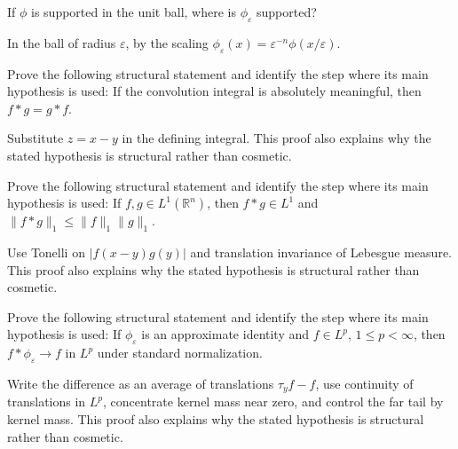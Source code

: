 \begin{problem}\label{prob:iii10-problem-08}
If \(\phi\) is supported in the unit ball, where is \(\phi_\varepsilon\) supported?
\end{problem}
\begin{solution}
In the ball of radius \(\varepsilon\), by the scaling
\(\phi_\varepsilon(x)=\varepsilon^{-n}\phi(x/\varepsilon)\).
\end{solution}

\begin{problem}[Commutativity]\label{prob:iii10-problem-09}
Prove the following structural statement and identify the step where its main hypothesis is used: If the convolution integral is absolutely meaningful, then $f*g=g*f$.
\end{problem}
\begin{solution}
Substitute $z=x-y$ in the defining integral. This proof also explains why the stated hypothesis is structural rather than cosmetic.
\end{solution}

\begin{problem}\label{prob:iii10-problem-10}
Prove the following structural statement and identify the step where its main hypothesis is used: If $f,g\in L^1(\mathbb R^n)$, then $f*g\in L^1$ and $\|f*g\|_1\le\|f\|_1\|g\|_1$.
\end{problem}
\begin{solution}
Use Tonelli on $|f(x-y)g(y)|$ and translation invariance of Lebesgue measure. This proof also explains why the stated hypothesis is structural rather than cosmetic.
\end{solution}

\begin{problem}\label{prob:iii10-problem-11}
Prove the following structural statement and identify the step where its main hypothesis is used: If $\phi_\varepsilon$ is an approximate identity and $f\in L^p$, $1\le p<\infty$, then $f*\phi_\varepsilon\to f$ in $L^p$ under standard normalization.
\end{problem}
\begin{solution}
Write the difference as an average of translations $\tau_yf-f$, use continuity of translations in $L^p$, concentrate kernel mass near zero, and control the far tail by kernel mass. This proof also explains why the stated hypothesis is structural rather than cosmetic.
\end{solution}

